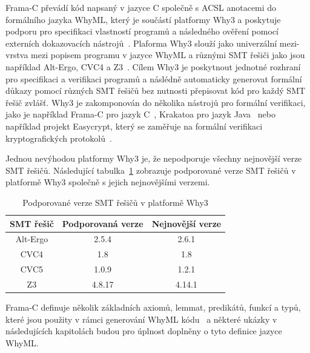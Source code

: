 Frama\mbox{-}C převádí kód napsaný v jazyce C společně s ACSL anotacemi do formálního jazyka WhyML,
který je součástí platformy Why3 a poskytuje podporu pro specifikaci vlastností programů
a následného ověření pomocí externích dokazovacích nástrojů~\cite{why3web}.
Plaforma Why3 slouží jako univerzální mezi-vrstva mezi popisem programu v jazyce WhyML a různými SMT řešiči
jako jsou například Alt-Ergo, CVC4 a Z3~\cite{boogie11why3}.
Cílem Why3 je poskytnout jednotné rozhraní pro specifikaci a verifikaci programů
a náslédně automaticky generovat formální důkazy pomocí různých SMT řešičů bez nutnosti přepisovat kód pro každý SMT řešič zvlášť.
Why3 je zakomponován do několika nástrojů pro formální verifikaci,
jako je například Frama\mbox{-}C pro jazyk C~\cite{BlanchardACSL2024},
Krakatoa pro jazyk Java~\cite{KrakatoaWhy} nebo například projekt Easycrypt,
který se zaměřuje na formální verifikaci kryptografických protokolů~\cite{why3web}.

Jednou nevýhodou platformy Why3 je,
že nepodporuje všechny nejnovější verze SMT řešičů.
Následující tabulka~\ref{tab:why3-smt-verze}
zobrazuje podporované verze SMT řešičů v platformě Why3 společně s jejich nejnovějšími verzemi.

\begin{table}[H]
    \centering
    \begin{tabular}{|c|c|c|}
        \hline
        SMT řešič & Podporovaná verze & Nejnovější verze \\
        \hline
        Alt-Ergo  & 2.5.4             & 2.6.1            \\
        CVC4      & 1.8               & 1.8              \\
        CVC5      & 1.0.9             & 1.2.1            \\
        Z3        & 4.8.17            & 4.14.1           \\
        \hline
    \end{tabular}
    \caption{Podporované verze SMT řešičů v platformě Why3}
    \label{tab:why3-smt-verze}
\end{table}


Frama\mbox{-}C definuje několik základních axiomů, lemmat, predikátů, funkcí a typů,
které jsou použity v rámci generování WhyML kódu~\cite{FCGitWhy} a
některé ukázky v následujících kapitolách budou pro úplnost doplněny o tyto definice jazyce WhyML\@.


